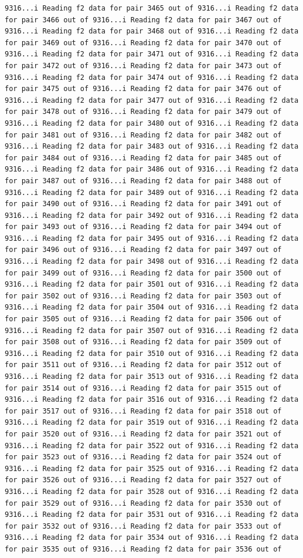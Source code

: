\documentclass[
]{article}
\begin{document}
\begin{verbatim}
9316...i Reading f2 data for pair 3465 out of 9316...i Reading f2 data for pair 3466 out of 9316...i Reading f2 data for pair 3467 out of 9316...i Reading f2 data for pair 3468 out of 9316...i Reading f2 data for pair 3469 out of 9316...i Reading f2 data for pair 3470 out of 9316...i Reading f2 data for pair 3471 out of 9316...i Reading f2 data for pair 3472 out of 9316...i Reading f2 data for pair 3473 out of 9316...i Reading f2 data for pair 3474 out of 9316...i Reading f2 data for pair 3475 out of 9316...i Reading f2 data for pair 3476 out of 9316...i Reading f2 data for pair 3477 out of 9316...i Reading f2 data for pair 3478 out of 9316...i Reading f2 data for pair 3479 out of 9316...i Reading f2 data for pair 3480 out of 9316...i Reading f2 data for pair 3481 out of 9316...i Reading f2 data for pair 3482 out of 9316...i Reading f2 data for pair 3483 out of 9316...i Reading f2 data for pair 3484 out of 9316...i Reading f2 data for pair 3485 out of 9316...i Reading f2 data for pair 3486 out of 9316...i Reading f2 data for pair 3487 out of 9316...i Reading f2 data for pair 3488 out of 9316...i Reading f2 data for pair 3489 out of 9316...i Reading f2 data for pair 3490 out of 9316...i Reading f2 data for pair 3491 out of 9316...i Reading f2 data for pair 3492 out of 9316...i Reading f2 data for pair 3493 out of 9316...i Reading f2 data for pair 3494 out of 9316...i Reading f2 data for pair 3495 out of 9316...i Reading f2 data for pair 3496 out of 9316...i Reading f2 data for pair 3497 out of 9316...i Reading f2 data for pair 3498 out of 9316...i Reading f2 data for pair 3499 out of 9316...i Reading f2 data for pair 3500 out of 9316...i Reading f2 data for pair 3501 out of 9316...i Reading f2 data for pair 3502 out of 9316...i Reading f2 data for pair 3503 out of 9316...i Reading f2 data for pair 3504 out of 9316...i Reading f2 data for pair 3505 out of 9316...i Reading f2 data for pair 3506 out of 9316...i Reading f2 data for pair 3507 out of 9316...i Reading f2 data for pair 3508 out of 9316...i Reading f2 data for pair 3509 out of 9316...i Reading f2 data for pair 3510 out of 9316...i Reading f2 data for pair 3511 out of 9316...i Reading f2 data for pair 3512 out of 9316...i Reading f2 data for pair 3513 out of 9316...i Reading f2 data for pair 3514 out of 9316...i Reading f2 data for pair 3515 out of 9316...i Reading f2 data for pair 3516 out of 9316...i Reading f2 data for pair 3517 out of 9316...i Reading f2 data for pair 3518 out of 9316...i Reading f2 data for pair 3519 out of 9316...i Reading f2 data for pair 3520 out of 9316...i Reading f2 data for pair 3521 out of 9316...i Reading f2 data for pair 3522 out of 9316...i Reading f2 data for pair 3523 out of 9316...i Reading f2 data for pair 3524 out of 9316...i Reading f2 data for pair 3525 out of 9316...i Reading f2 data for pair 3526 out of 9316...i Reading f2 data for pair 3527 out of 9316...i Reading f2 data for pair 3528 out of 9316...i Reading f2 data for pair 3529 out of 9316...i Reading f2 data for pair 3530 out of 9316...i Reading f2 data for pair 3531 out of 9316...i Reading f2 data for pair 3532 out of 9316...i Reading f2 data for pair 3533 out of 9316...i Reading f2 data for pair 3534 out of 9316...i Reading f2 data for pair 3535 out of 9316...i Reading f2 data for pair 3536 out of 
\end{verbatim}
\end{document}
